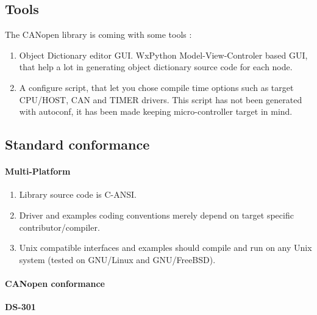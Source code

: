\documentclass[a4paper,12pt]{book}
\newcommand\liststyleLii{%
\renewcommand\labelitemi{{--}}
\renewcommand\labelitemii{{--}}
\renewcommand\labelitemiii{{--}}
\renewcommand\labelitemiv{{--}}
}
\newcommand\liststyleLiii{%
\renewcommand\labelitemi{{--}}
\renewcommand\labelitemii{{--}}
\renewcommand\labelitemiii{{--}}
\renewcommand\labelitemiv{{--}}
}
\newcommand{\canopen}{CANopen}
\begin{document}
\subsection{Tools }
The \canopen{} library is coming with some tools :

\liststyleLii
\begin{enumerate}
\item Object Dictionary editor GUI. WxPython Model{}-View{}-Controler
based GUI, that help a lot in generating object dictionary source code
for each node.
\item A configure script, that let you chose compile time options such
as target CPU/HOST, CAN and TIMER drivers.\newline
This script has not been generated with autoconf, it has been made
keeping micro{}-controller target in mind.
\end{enumerate}
\subsection{Standard conformance}
\paragraph{Multi{}-Platform}
\liststyleLiii
\begin{enumerate}
\item Library source code is C{}-ANSI.
\item Driver and examples coding conventions merely depend on target
specific contributor/compiler.
\item Unix compatible interfaces and examples should compile and run on
any Unix system (tested on GNU/Linux and GNU/FreeBSD).
\end{enumerate}
\paragraph{\canopen{} conformance}
{\bfseries\upshape
DS{}-301}
\end{document}
